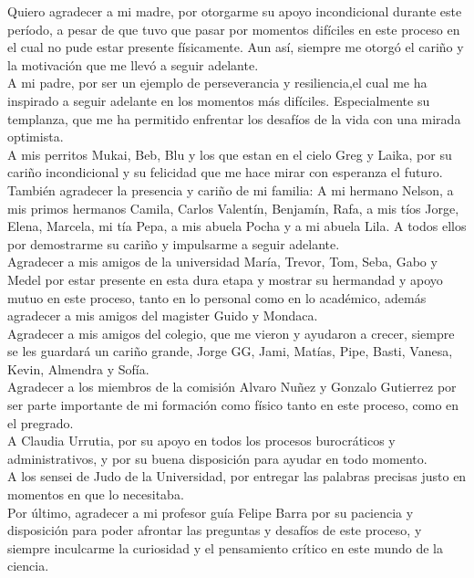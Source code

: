 \documentclass[
	spanish, %
	letterpaper, oneside
]{book}
\begin{document}
\begin{acknowledgments}
   Quiero agradecer a mi madre, por otorgarme su apoyo incondicional durante este período, a pesar de que tuvo que pasar por momentos difíciles en este proceso en el cual no pude estar presente físicamente. Aun así, siempre me otorgó el cariño y la motivación que me llevó a seguir adelante.  
   \\

   A mi padre, por ser un ejemplo de perseverancia y resiliencia,el cual me ha inspirado a seguir adelante en los momentos más difíciles. Especialmente su templanza, que me ha permitido enfrentar los desafíos de la vida con una mirada optimista. 
   \\

   A mis perritos Mukai, Beb, Blu y los que estan en el cielo Greg y Laika, por su cariño incondicional y su felicidad que me hace mirar con esperanza el futuro.
   \\

   También agradecer la presencia  y cariño de mi familia: A mi hermano Nelson, a mis primos hermanos Camila, Carlos Valentín, Benjamín, Rafa, a mis tíos Jorge, Elena, Marcela, mi tía Pepa, a mis abuela Pocha y a mi abuela Lila. A todos ellos por demostrarme su cariño y impulsarme a seguir adelante. 
   \\

   Agradecer a mis amigos de la universidad María, Trevor, Tom, Seba, Gabo y Medel por estar presente en esta dura etapa y mostrar su hermandad y apoyo mutuo en este proceso, tanto en lo personal como en lo académico, además agradecer a mis amigos del magister Guido y Mondaca.
   \\

   Agradecer a mis amigos del colegio, que me vieron y ayudaron a crecer, siempre se les guardará un cariño grande, Jorge GG, Jami, Matías, Pipe, Basti, Vanesa, Kevin, Almendra y Sofía.  
   \\

   Agradecer a los miembros de la comisión Alvaro Nuñez y Gonzalo Gutierrez por ser parte importante de mi formación como físico tanto en este proceso, como en el pregrado.
   \\

   A Claudia Urrutia, por su apoyo en todos los procesos burocráticos y administrativos, y por su buena disposición para ayudar en todo momento. 
   \\

   A los sensei de Judo de la Universidad, por entregar las palabras precisas justo en momentos en que lo necesitaba.
   \\

   Por último, agradecer a mi profesor guía Felipe Barra por su paciencia y disposición para poder afrontar las preguntas y desafíos de este proceso, y siempre inculcarme la curiosidad y el pensamiento crítico en este mundo de la ciencia. 

\end{acknowledgments}

\templateIndex

\templateFinalcfg



\end{document}
